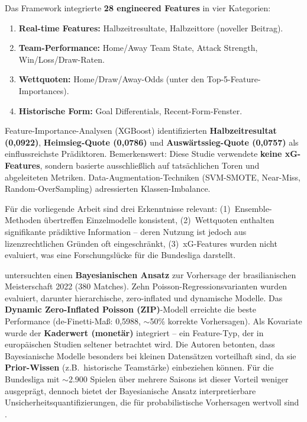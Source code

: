 Das Framework integrierte \textbf{28 engineered Features} in vier Kategorien:
\begin{enumerate}
    \item \textbf{Real-time Features:} Halbzeitresultate, Halbzeittore (noveller Beitrag).
    \item \textbf{Team-Performance:} Home/Away Team State, Attack Strength, Win/Loss/Draw-Raten.
    \item \textbf{Wettquoten:} Home/Draw/Away-Odds (unter den Top-5-Feature-Importances).
    \item \textbf{Historische Form:} Goal Differentials, Recent-Form-Fenster.
\end{enumerate}

Feature-Importance-Analysen (XGBoost) identifizierten \textbf{Halbzeitresultat (0,0922)}, \textbf{Heimsieg-Quote (0,0786)} und \textbf{Auswärtssieg-Quote (0,0757)} als einflussreichste Prädiktoren. Bemerkenswert: Diese Studie verwendete \textbf{keine xG-Features}, sondern basierte ausschließlich auf tatsächlichen Toren und abgeleiteten Metriken. Data-Augmentation-Techniken (SVM-SMOTE, Near-Miss, Random-OverSampling) adressierten Klassen-Imbalance.

Für die vorliegende Arbeit sind drei Erkenntnisse relevant: (1)~Ensemble-Methoden übertreffen Einzelmodelle konsistent, (2)~Wettquoten enthalten signifikante prädiktive Information -- deren Nutzung ist jedoch aus lizenzrechtlichen Gründen oft eingeschränkt, (3)~xG-Features wurden nicht evaluiert, was eine Forschungslücke für die Bundesliga darstellt.

\textcite{RibeiroEtAl2025} untersuchten einen \textbf{Bayesianischen Ansatz} zur Vorhersage der brasilianischen Meisterschaft 2022 (380 Matches). Zehn Poisson-Regressionsvarianten wurden evaluiert, darunter hierarchische, zero-inflated und dynamische Modelle. Das \textbf{Dynamic Zero-Inflated Poisson (ZIP)}-Modell erreichte die beste Performance (de-Finetti-Maß: 0,5988, $\sim$50\% korrekte Vorhersagen). Als Kovariate wurde der \textbf{Kaderwert (monetär)} integriert -- ein Feature-Typ, der in europäischen Studien seltener betrachtet wird. Die Autoren betonten, dass Bayesianische Modelle besonders bei kleinen Datensätzen vorteilhaft sind, da sie \textbf{Prior-Wissen} (z.B.\ historische Teamstärke) einbeziehen können. Für die Bundesliga mit $\sim$2.900 Spielen über mehrere Saisons ist dieser Vorteil weniger ausgeprägt, dennoch bietet der Bayesianische Ansatz interpretierbare Unsicherheitsquantifizierungen, die für probabilistische Vorhersagen wertvoll sind \cite{DobsonGoddard2011}.

